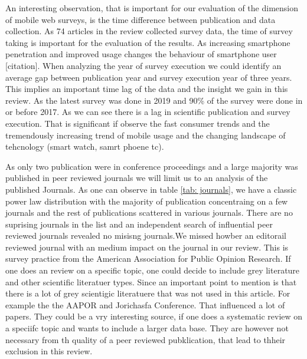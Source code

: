 An interesting observation, that is important for our evaluation of the dimension of mobile web surveys, is the time difference between publication and data collection. As 74 articles in the review collected survey data, the time of survey taking is important for the evaluation of the results. As increasing smartphone penetration and improved usage changes the behaviour of smartphone user [citation]. When analyzing the year of survey execution we could identify an average gap between publication year and survey execution year of three years. This implies an important time lag of the data and the insight we gain in this review. As the latest survey was done in 2019 and 90\% of the survey were done in or before 2017. As we can see there is a lag in scientific publication and survey execution. That is significant if observe the fast consumer trends and the tremendously increasing trend of mobile usage and the changing landscape of tehcnology (smart watch, samrt phoene tc).

As only two publication were in conference proceedings and a large majority was published in peer reviewed journals we will limit us to an analysis of the published Journals. As one can observe in table \ref{tab: journals}, we have a classic power law distribution with the majority of publication concentraing on a few journals and the rest of publications scattered in various journals. There are no suprising journals in the list and an independent search of influential peer reviewed journals revealed no misisng journals.We missed howber an editorail reviewed journal with an medium impact on the journal in our review. This is  survey practice from the American Association for Public Opinion Research. If one does an review on a specific topic, one could decide to include grey literature and other scientific literatuer types.  Since an important point to mention is that there is a lot of grey scientigic literatuere that was not used in this article. For example the the AAPOR and Jorichasfa Conference. That influenced a lot of papers. They could be a vry interesting source, if one does a systematic review on a speciifc topic and wants to include a larger data base. They are however not necessary from th quality of a peer reviewed pubklication, that lead to thheir exclusion in this review.

